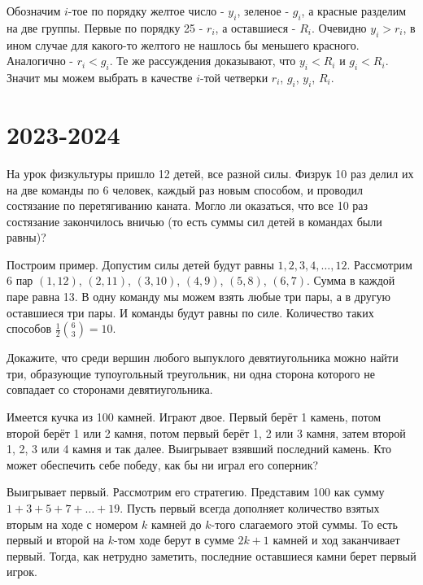 \documentclass[11pt, a4paper]{template}
\begin{document}
\begin{solution}
Обозначим $i$-тое по порядку желтое число - $y_{i}$, зеленое - $g_{i}$, а красные разделим на две группы. Первые по порядку 25 - $r_{i}$, а оставшиеся - $R_{i}$. Очевидно $y_{i} > r_{i}$, в ином случае для какого-то желтого не нашлось бы меньшего красного. Аналогично - $r_{i} < g_{i}$. Те же рассуждения доказывают, что $y_{i} < R_{i}$ и $g_{i} < R_{i}$. Значит мы можем выбрать в качестве $i$-той четверки $r_{i}$, $g_{i}$, $y_{i}$, $R_{i}$.
\end{solution}

\chapter{2023-2024}

\begin{exercise}
На урок физкультуры пришло 12 детей, все разной силы. Физрук 10 раз делил их на две команды
по 6 человек, каждый раз новым способом, и проводил состязание по перетягиванию каната.
Могло ли оказаться, что все 10 раз состязание закончилось вничью (то есть суммы сил детей в
командах были равны)?
\end{exercise}

\begin{solution}
Построим пример. Допустим силы детей будут равны $1, 2, 3, 4, \dots, 12$. Рассмотрим 6 пар $(1, 12)$, $(2, 11)$, $(3, 10)$, $(4, 9)$, $(5, 8)$, $(6, 7)$. Сумма в каждой паре равна 13. В одну команду мы можем взять любые три пары, а в другую оставшиеся три пары. И команды будут равны по силе. Количество таких способов $\frac{1}{2} \binom{6}{3} = 10$.
\end{solution}

\begin{exercise}
Докажите, что среди вершин любого выпуклого девятиугольника можно найти три, образующие
тупоугольный треугольник, ни одна сторона которого не совпадает со сторонами девятиугольника.
\end{exercise}

\begin{exercise}
Имеется кучка из 100 камней. Играют двое. Первый берёт 1 камень, потом второй берёт 1 или
2 камня, потом первый берёт 1, 2 или 3 камня, затем второй 1, 2, 3 или 4 камня и так далее.
Выигрывает взявший последний камень. Кто может обеспечить себе победу, как бы ни играл его
соперник?
\end{exercise}

\begin{solution}
Выигрывает первый. Рассмотрим его стратегию. Представим 100 как сумму $1 + 3 + 5 + 7 + \dots + 19$. Пусть первый всегда дополняет количество взятых вторым на ходе с номером $k$ камней до $k$-того слагаемого этой суммы. То есть первый и второй на $k$-том ходе берут в сумме $2k + 1$ камней и ход заканчивает первый. Тогда, как нетрудно заметить, последние оставшиеся камни берет первый игрок.
\end{solution}
\end{document}

